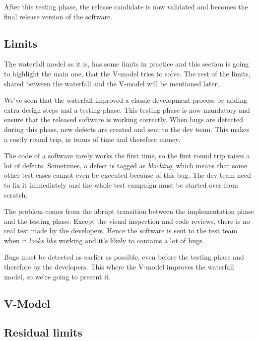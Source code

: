 After this testing phase, the release candidate is now validated and becomes
the final release version of the software.

\subsection{Limits}\label{subsec:limits}
The waterfall model as it is, has some limits in practice and this section is
going to highlight the main one, that the V-model tries to solve.
The rest of the limits, shared between the waterfall and the V-model will be
mentioned later.

We've seen that the waterfall improved a classic development process by
adding extra design steps and a testing phase.
This testing phase is now mandatory and ensure that the released software is
working correctly.
When bugs are detected during this phase, new defects are created and sent to
the dev team.
This makes a costly round trip, in terms of time and therefore money.

The code of a software rarely works the first time, so the first round trip
raises a lot of defects.
Sometimes, a defect is tagged as \textit{blocking}, which means that some other
test cases cannot even be executed because of this bug.
The dev team need to fix it immediately and the whole test campaign must be
started over from scratch.

The problem comes from the abrupt transition between the implementation phase
and the testing phase.
Except the visual inspection and code reviews, there is no real test made by
the developers.
Hence the software is sent to the test team when it \textit{looks like}
working and it's likely to contains a lot of bugs.

Bugs must be detected as earlier as possible, even before the
testing phase and therefore by the developers.
This where the V-model improves the waterfall model, so we're going to
present it.

\subsection{V-Model}\label{subsec:v-model}

\subsection{Residual limits}\label{subsec:residual-limits}
